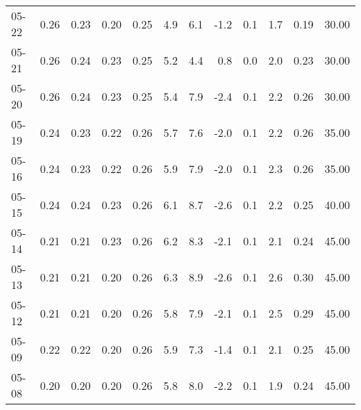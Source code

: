 \begin{threeparttable}
{\begin{tabular}{lrrrrrrrrrrr}
  05-22 &          0.26 &          0.23 &          0.20 &        0.25 &                 4.9 &                 6.1 &       -1.2 &                 0.1 &              1.7 &            0.19 &                  30.00 \\
  05-21 &          0.26 &          0.24 &          0.23 &        0.25 &                 5.2 &                 4.4 &        0.8 &                 0.0 &              2.0 &            0.23 &                  30.00 \\
  05-20 &          0.26 &          0.24 &          0.23 &        0.25 &                 5.4 &                 7.9 &       -2.4 &                 0.1 &              2.2 &            0.26 &                  30.00 \\
  05-19 &          0.24 &          0.23 &          0.22 &        0.26 &                 5.7 &                 7.6 &       -2.0 &                 0.1 &              2.2 &            0.26 &                  35.00 \\
  05-16 &          0.24 &          0.23 &          0.22 &        0.26 &                 5.9 &                 7.9 &       -2.0 &                 0.1 &              2.3 &            0.26 &                  35.00 \\
  05-15 &          0.24 &          0.24 &          0.23 &        0.26 &                 6.1 &                 8.7 &       -2.6 &                 0.1 &              2.2 &            0.25 &                  40.00 \\
  05-14 &          0.21 &          0.21 &          0.23 &        0.26 &                 6.2 &                 8.3 &       -2.1 &                 0.1 &              2.1 &            0.24 &                  45.00 \\
  05-13 &          0.21 &          0.21 &          0.20 &        0.26 &                 6.3 &                 8.9 &       -2.6 &                 0.1 &              2.6 &            0.30 &                  45.00 \\
  05-12 &          0.21 &          0.21 &          0.20 &        0.26 &                 5.8 &                 7.9 &       -2.1 &                 0.1 &              2.5 &            0.29 &                  45.00 \\
  05-09 &          0.22 &          0.22 &          0.20 &        0.26 &                 5.9 &                 7.3 &       -1.4 &                 0.1 &              2.1 &            0.25 &                  45.00 \\
  05-08 &          0.20 &          0.20 &          0.20 &        0.26 &                 5.8 &                 8.0 &       -2.2 &                 0.1 &              1.9 &            0.24 &                  45.00 \\

\end{tabular}}
\end{threeparttable}
